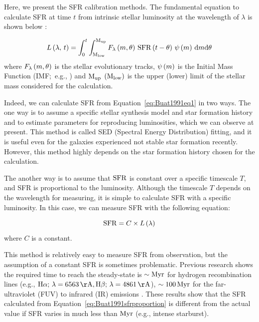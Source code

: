 Here, we present the SFR calibration methods.
The fundamental equation to calculate SFR at time $t$ from intrinsic stellar luminosity at the wavelength of $\lambda$ is shown below \citep{Buat1991}:

\begin{equation}\label{eq:Buat1991eq1}
    L\left(\lambda,\,t\right)=\int_{0}^{t} \int_{\mathrm{M}_{\mathrm{low}}}^{\mathrm{M}_{\mathrm{up}}} F_{\lambda}\left(m, \theta\right)\,\mathrm{SFR}\left(t-\theta\right)\,\psi\left(m\right)\,\mathrm{d}m \mathrm{d} \theta
\end{equation}
where $F_{\lambda}\left(m, \theta\right)$ is the stellar evolutionary tracks, $\psi\left(m\right)$ is the Initial Mass Function (IMF;~e.g., \citealt{Salpeter1955, Kroupa2001, Chabrier2003}) and $\mathrm{M}_{\mathrm{up}}$ $\left(\mathrm{M}_{\mathrm{low}}\right)$ is the upper (lower) limit of the stellar mass considered for the calculation.

Indeed, we can calculate SFR from Equation~\ref{eq:Buat1991eq1} in two ways.
The one way is to assume a specific stellar synthesis model and star formation history and to estimate parameters for reproducing luminosities, which we can observe at present.
This method is called SED (Spectral Energy Distribution) fitting, and it is useful even for the galaxies experienced not stable star formation recently.
However, this method highly depends on the star formation history chosen for the calculation.

The another way is to assume that $\mathrm{SFR}$ is constant over a specific timescale $T$, and SFR is proportional to the luminosity.
Although the timescale $T$ depends on the wavelength for measuring, it is simple to calculate SFR with a specific luminosity.
In this case, we can measure SFR with the following equation:

\begin{equation}\label{eq:Buat1991sfrproportion}
    \mathrm{SFR} = C \times L\left(\lambda\right)
\end{equation}
where $C$ is a constant.

This method is relatively easy to measure SFR from observation, but the assumption of a constant SFR is sometimes problematic.
Previous research shows the required time to reach the steady-state is $\sim\mathrm{Myr}$ for hydrogen recombination lines (e.g., $\mr{H\alpha};\,\lambda = 6563\,\mr{\AA}, \mr{H\beta};\,\lambda = 4861\,\mr{\AA}$), $\sim 100\,\mathrm{Myr}$ for the far-ultraviolet (FUV) to infrared (IR) emissions \citep{Hao2011, Murphy2011, Kennicutt2012}.
These results show that the SFR calculated from Equation~\ref{eq:Buat1991sfrproportion} is different from the actual value if SFR varies in much less than $\mathrm{Myr}$ (e.g., intense starburst).

